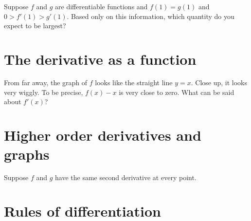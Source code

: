 \documentclass{ximera}
\begin{document}
\begin{problem}
  Suppose $f$ and $g$ are differentiable functions and $f(1) = g(1)$ and 
  $0 > f'(1) > g'(1)$.  Based only on this information, which quantity
  do you expect to be largest?
  \begin{multipleChoice}
  \end{multipleChoice}
\end{problem}

\clearpage

\section{The derivative as a function}

\begin{problem}
  From far away, the graph of $f$ looks like the straight line
  $y = x$.  Close up, it looks very wiggly.  To be precise, $f(x) - x$
  is very close to zero.  What can be said about $f'(x)$?
  \begin{multipleChoice}
  \end{multipleChoice}
\end{problem}

\clearpage

\section{Higher order derivatives and graphs}

\begin{problem}
  Suppose $f$ and $g$ have the same second derivative at every point.  
  \begin{multipleChoice}
  \end{multipleChoice}
\end{problem}

\clearpage

\section{Rules of differentiation}
\end{document}
